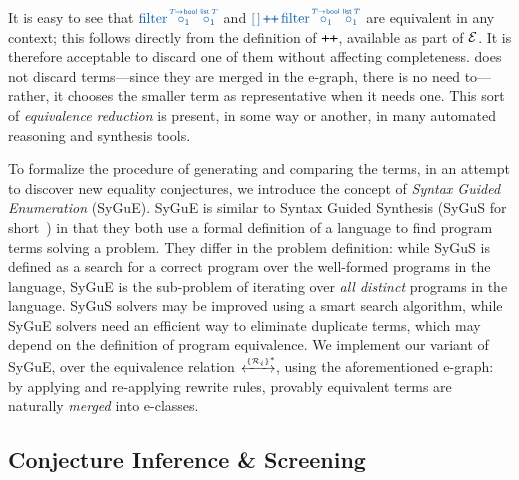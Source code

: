 It is easy to see that 
$\clrterm\tfilter\pholder{1}{\!T\!\to\tbool}\pholder{1}{\tlist\,T}$ and $\clrterm\lnil \concat
  \tfilter\pholder{1}{\!T\!\to\tbool}\pholder{1}{\tlist\,T}$
are equivalent in any context; this follows directly from the definition of $\concat$, available as part of $\mathcal{E}$. 
It is therefore acceptable to discard one of them without affecting completeness.
\TheSy does not discard terms---since they are merged in the e-graph, there is no need to---rather, it chooses the smaller term as representative when it needs one.
This sort of \emph{equivalence reduction} is present, in some way or another, in many automated reasoning and synthesis tools.

To formalize the procedure of generating and comparing the terms,
in an attempt to discover new equality conjectures,
we introduce the concept of \emph{Syntax Guided Enumeration} (SyGuE).
SyGuE is similar to Syntax Guided Synthesis (SyGuS for short~\cite{DSSE2015:Alur}) in that they both use a formal definition of a language to find program terms solving a problem.
They differ in the problem definition: while SyGuS is defined as a search for a correct program over the well-formed programs in the language,
SyGuE is the sub-problem of iterating over \emph{all distinct} programs in the language.
SyGuS solvers may be improved using a smart search algorithm, while SyGuE solvers need an efficient way to eliminate duplicate terms, which may depend on the definition of program equivalence.
We implement our variant of SyGuE, over the equivalence relation ${\!} \xleftrightarrow[]{\scriptscriptstyle\{\mathcal{R}_i\}^*\!\!} {\!\!}$, using the aforementioned e-graph:
by applying and re-applying rewrite rules,
provably equivalent terms are naturally \emph{merged} into e-classes.

\subsection{Conjecture Inference \& Screening}
\label{overview:conjecture}

